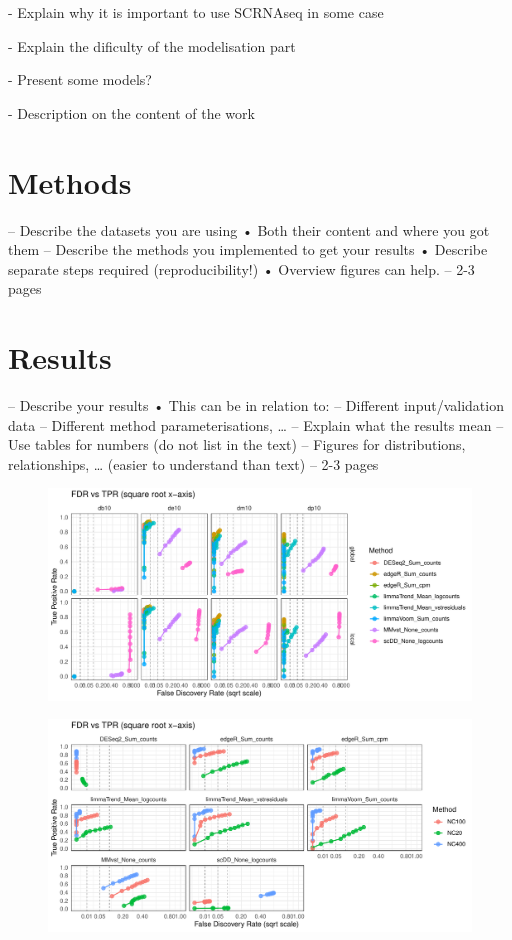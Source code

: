 \documentclass[a4paper, 11pt, twocolumn]{article}
\begin{document}
- Explain why it is important to use SCRNAseq in some case

- Explain the dificulty of the modelisation part

- Present some models?

- Description on the content of the work

\section{Methods}
– Describe the datasets you are using
• Both their content and where you got them
– Describe the methods you implemented to get
your results
• Describe separate steps required (reproducibility!)
• Overview figures can help.
– 2-3 pages
\section{Results}

– Describe your results
• This can be in relation to:
– Different input/validation data
– Different method parameterisations, …
– Explain what the results mean
– Use tables for numbers (do not list in the text)
– Figures for distributions, relationships, … (easier
to understand than text)
– 2-3 pages
\begin{figure}[!ht]
	\centering
	\includegraphics[width = \linewidth]{figs/fdrtpr_prop_method.pdf}
	\caption{
	}
	\label{fdrtpr_prop}
\end{figure}

\begin{figure}[!ht]
	\centering
	\includegraphics[width = \linewidth]{figs/fdrtpr_size_method.pdf}
	\caption{
	}
	\label{fdrtpr_size}
\end{figure}
\end{document}
